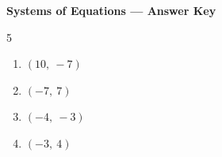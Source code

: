 \documentclass[10pt,letterpaper]{article}
\begin{document}
\begin{center}
  {\large \textbf{Systems of Equations — Answer Key}}
\end{center}
\vspace{0.5em}

\begin{multicols}{5}
\begin{enumerate}[itemsep=0.25em, topsep=0pt, leftmargin=*]
  \item $(10,\ -7)$
  \item $(-7,\ 7)$
  \item $(-4,\ -3)$
  \item $(-3,\ 4)$
\end{enumerate}
\end{multicols}
\end{document}
